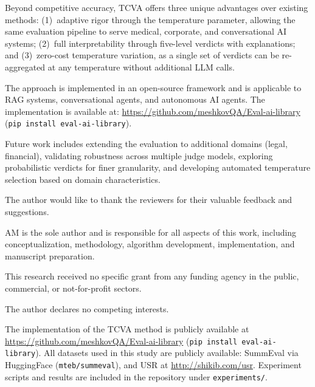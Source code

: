 \documentclass[sn-basic]{sn-jnl}
\theoremstyle{thmstyleone}%
\theoremstyle{thmstyletwo}%
\theoremstyle{thmstylethree}%
\begin{document}
Beyond competitive accuracy, TCVA offers three unique advantages over existing methods: (1)~adaptive rigor through the temperature parameter, allowing the same evaluation pipeline to serve medical, corporate, and conversational AI systems; (2)~full interpretability through five-level verdicts with explanations; and (3)~zero-cost temperature variation, as a single set of verdicts can be re-aggregated at any temperature without additional LLM calls.

The approach is implemented in an open-source framework and is applicable to RAG systems, conversational agents, and autonomous AI agents. The implementation is available at: \url{https://github.com/meshkovQA/Eval-ai-library} (\texttt{pip install eval-ai-library}).

Future work includes extending the evaluation to additional domains (legal, financial), validating robustness across multiple judge models, exploring probabilistic verdicts for finer granularity, and developing automated temperature selection based on domain characteristics.

\backmatter


The author would like to thank the reviewers for their valuable feedback and suggestions.


AM is the sole author and is responsible for all aspects of this work, including conceptualization, methodology, algorithm development, implementation, and manuscript preparation.


This research received no specific grant from any funding agency in the public, commercial, or not-for-profit sectors.


The author declares no competing interests.


The implementation of the TCVA method is publicly available at \url{https://github.com/meshkovQA/Eval-ai-library} (\texttt{pip install eval-ai-library}). All datasets used in this study are publicly available: SummEval \cite{Fabbri2021} via HuggingFace (\texttt{mteb/summeval}), and USR \cite{Mehri2020} at \url{http://shikib.com/usr}. Experiment scripts and results are included in the repository under \texttt{experiments/}.


\end{document}
